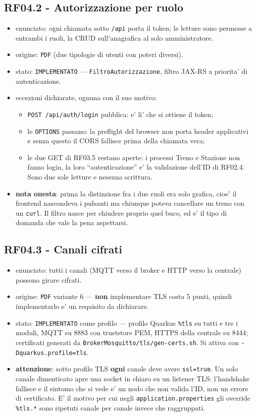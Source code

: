 \documentclass[11pt]{article}
\begin{document}
\subsection{RF04.2 - Autorizzazione per ruolo}
\label{sec:org8868820}
\begin{itemize}
\item enunciato: ogni chiamata sotto \texttt{/api} porta il token; le letture sono permesse a entrambi i ruoli,
la CRUD sull'anagrafica al solo amministratore.
\item origine: \texttt{PDF} (due tipologie di utenti con poteri diversi).
\item stato: \texttt{IMPLEMENTATO} — \texttt{FiltroAutorizzazione}, filtro JAX-RS a priorita' di autenticazione.
\item eccezioni dichiarate, ognuna con il suo motivo:
\begin{itemize}
\item \texttt{POST /api/auth/login} pubblica: e' li' che si ottiene il token;
\item le \texttt{OPTIONS} passano: la preflight del browser non porta header applicativi e senza questo il
CORS fallisce prima della chiamata vera;
\item le due GET di RF03.5 restano aperte: i processi Treno e Stazione non fanno login, la loro
``autenticazione'' e' la validazione dell'ID di RF02.4. Sono due sole letture e nessuna scrittura.
\end{itemize}
\item \textbf{nota onesta}: prima la distinzione fra i due ruoli era solo grafica, cioe' il frontend nascondeva
i pulsanti ma chiunque poteva cancellare un treno con un \texttt{curl}. Il filtro nasce per chiudere
proprio quel buco, ed e' il tipo di domanda che vale la pena aspettarsi.
\end{itemize}
\subsection{RF04.3 - Canali cifrati}
\label{sec:org3cdd9f9}
\begin{itemize}
\item enunciato: tutti i canali (MQTT verso il broker e HTTP verso la centrale) possono girare cifrati.
\item origine: \texttt{PDF} variante 6 — \textbf{non} implementare TLS costa 5 punti, quindi implementarlo e' un
requisito da dichiarare.
\item stato: \texttt{IMPLEMENTATO} come profilo — profilo Quarkus \texttt{\%tls} su tutti e tre i moduli, MQTT su 8883
con truststore PEM, HTTPS della centrale su 8444; certificati generati da
\texttt{BrokerMosquitto/tls/gen-certs.sh}. Si attiva con \texttt{-Dquarkus.profile=tls}.
\item \textbf{attenzione}: sotto profilo TLS \textbf{ogni} canale deve avere \texttt{ssl=true}. Un solo canale dimenticato
apre una socket in chiaro su un listener TLS: l'handshake fallisce e il sintomo che si vede e' un
nodo che non valida l'ID, non un errore di certificato. E' il motivo per cui negli
\texttt{application.properties} gli override \texttt{\%tls.*} sono ripetuti canale per canale invece che
raggruppati.
\end{itemize}
\end{document}
